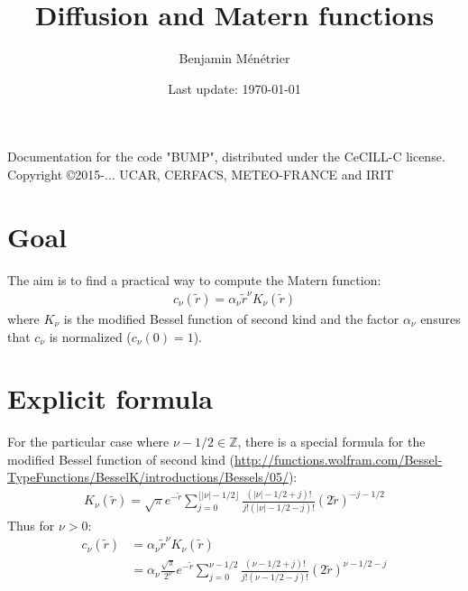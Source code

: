 \documentclass[12pt]{scrartcl}
\begin{document}
\title{Diffusion and Matern functions}
\author{Benjamin Ménétrier}
\date{Last update: \today}

\thispagestyle{empty}

\maketitle
\begin{center}
Documentation for the code "BUMP", distributed under the CeCILL-C license.\\
Copyright \copyright 2015-... UCAR, CERFACS, METEO-FRANCE and IRIT
\end{center}

\section{Goal}
The aim is to find a practical way to compute the Matern function:
\begin{align}
c_\nu(\tilde{r}) = \alpha_\nu \tilde{r}^\nu K_\nu(\tilde{r})
\end{align}
where $K_\nu$ is the modified Bessel function of second kind and the factor $\alpha_\nu$ ensures that $c_\nu$ is normalized ($c_\nu(0) = 1$).

\section{Explicit formula}
For the particular case where $\nu-1/2 \in \mathbb{Z}$, there is a special formula for the modified Bessel function of second kind (\url{http://functions.wolfram.com/Bessel-TypeFunctions/BesselK/introductions/Bessels/05/}):
\begin{align}
K_\nu(\tilde{r}) = \sqrt{\pi} e^{-\tilde{r}} \sum_{j=0}^{\lfloor |\nu|-1/2 \rfloor} \frac{\left(|\nu|-1/2+j\right)!}{j!\left(|\nu|-1/2-j\right)!}(2\tilde{r})^{-j-1/2}
\end{align}
Thus for $\nu>0$:
\begin{align}
c_\nu(\tilde{r}) & = \alpha_\nu \tilde{r}^\nu K_\nu(\tilde{r}) \\
& = \alpha_\nu \frac{\sqrt{\pi}}{2^\nu} e^{-\tilde{r}} \sum_{j=0}^{\nu-1/2} \frac{\left(\nu-1/2+j\right)!}{j!\left(\nu-1/2-j\right)!} (2\tilde{r})^{\nu-1/2-j} \\
\end{align}
\end{document}

